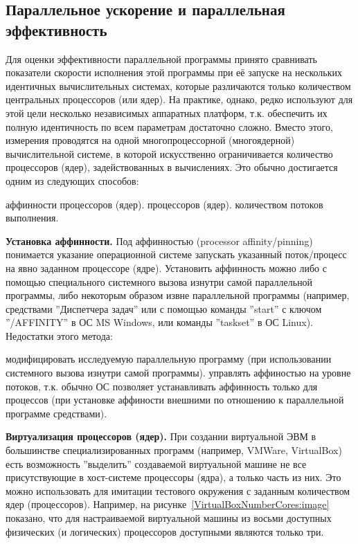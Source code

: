 \subsection{Параллельное ускорение и параллельная эффективность}

Для оценки эффективности параллельной программы принято сравнивать показатели скорости исполнения этой программы при её запуске на нескольких идентичных вычислительных системах, которые различаются только количеством центральных процессоров (или ядер). На практике, однако, редко используют для этой цели несколько независимых аппаратных платформ, т.к. обеспечить их полную идентичность по всем параметрам достаточно сложно. Вместо этого, измерения проводятся на одной многопроцессорной (многоядерной) вычислительной системе, в которой искусственно ограничивается количество процессоров (ядер), задействованных в вычислениях. Это обычно достигается одним из следующих способов:

\begin{itemize}
     аффинности процессоров (ядер).
     процессоров (ядер).
     количеством потоков выполнения.
\end{itemize}

\textbf{Установка аффинности.} Под аффинностью (processor affin\-i\-ty/pin\-ning) понимается указание операционной системе запускать указанный поток/процесс на явно заданном процессоре (ядре). Установить аффинность можно либо с помощью специального системного вызова изнутри самой параллельной программы, либо некоторым образом извне параллельной программы (например, средствами ''Диспетчера задач'' или с помощью команды ''start'' с ключом ''/AFFINITY'' в ОС MS Windows, или команды ''taskset'' в ОС Linux). Недостатки этого метода:

\begin{itemize}
     модифицировать исследуемую параллельную программу (при использовании системного вызова изнутри самой программы).
     управлять аффиностью на уровне потоков, т.к. обычно ОС позволяет устанавливать аффинность только для процессов (при установке аффиности внешними по отношению к параллельной программе средствами).
\end{itemize}

\textbf{Виртуализация процессоров (ядер).} При создании виртуальной ЭВМ в большинстве специализированных программ (например, VMWare, Virtual\-Box) есть возможность ''выделить'' создаваемой виртуальной машине не все присутствующие в хост-системе процессоры (ядра), а только часть из них. Это можно использовать для имитации тестового окружения с заданным количеством ядер (процессоров). Например, на рисунке~\ref{VirtualBoxNumberCores:image} показано, что для настраиваемой виртуальной машины из восьми доступных физических (и логических) процессоров доступными являются только три.

